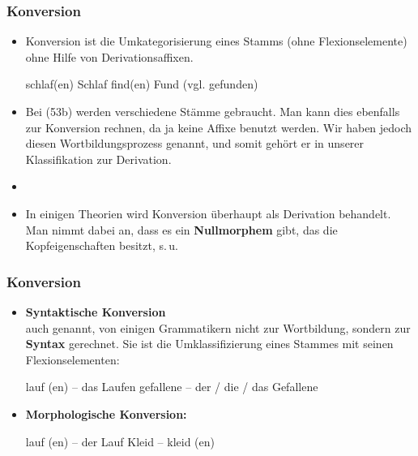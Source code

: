 \begin{frame}
\frametitle{Konversion}

\begin{itemize}
	\item Konversion ist die Umkategorisierung eines Stamms (ohne Flexionselemente) ohne Hilfe von Derivationsaffixen.
	
	\eal 
	\ex schlaf(en) \ras Schlaf
	\ex find(en) \ras Fund (vgl. gefunden)
	\zl
	
	\item Bei (53b) werden verschiedene Stämme gebraucht. Man kann dies ebenfalls zur Konversion rechnen, da ja keine Affixe benutzt werden. Wir haben jedoch diesen Wortbildungsprozess \textbf{} genannt, und somit gehört er in unserer Klassifikation zur Derivation.
	\item []
	\item In einigen Theorien wird Konversion überhaupt als Derivation behandelt. Man nimmt dabei an, dass es ein \textbf{Nullmorphem} gibt, das die Kopfeigenschaften besitzt, s.\,u.
	
\end{itemize}


\end{frame}




\begin{frame}
\frametitle{Konversion}

\begin{itemize}
	\item \textbf{Syntaktische Konversion}\\ auch  genannt, von einigen Grammatikern nicht zur Wortbildung, sondern zur \textbf{Syntax} gerechnet. Sie ist die Umklassifizierung eines Stammes mit seinen Flexionselementen:
	
	\eal 
	\ex lauf (en) -- das Laufen 
	\ex gefallene -- der / die / das Gefallene
	\zl
	
	\item \textbf{Morphologische Konversion:}
	
	\eal 
	\ex lauf (en) -- der Lauf
	\ex Kleid -- kleid (en)
	\zl
	
\end{itemize}


\end{frame}





